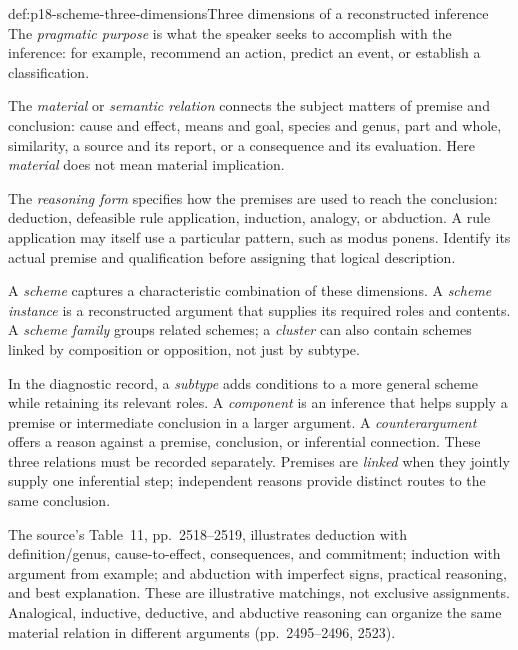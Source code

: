\begin{hbdefinition}{def:p18-scheme-three-dimensions}{Three dimensions of a reconstructed inference}
The \emph{pragmatic purpose} is what the speaker seeks to accomplish
with the inference: for example, recommend an action, predict an event,
or establish a classification.

The \emph{material} or \emph{semantic relation} connects the subject
matters of premise and conclusion: cause and effect, means and goal,
species and genus, part and whole, similarity, a source and its report,
or a consequence and its evaluation. Here \emph{material} does not mean
material implication.

The \emph{reasoning form} specifies how the premises are used to reach
the conclusion: deduction, defeasible rule application, induction,
analogy, or abduction. A rule application may itself use a particular
pattern, such as modus ponens. Identify its actual premise and
qualification before assigning that logical description.

A \emph{scheme} captures a characteristic combination of these
dimensions. A \emph{scheme instance} is a reconstructed argument that
supplies its required roles and contents. A \emph{scheme family}
groups related schemes; a \emph{cluster} can also contain schemes linked
by composition or opposition, not just by subtype.

In the diagnostic record, a \emph{subtype} adds conditions to a
more general scheme while retaining its relevant roles.
A \emph{component} is an inference that helps supply a premise
or intermediate conclusion in a larger argument.
A \emph{counterargument} offers a reason against a premise,
conclusion, or inferential connection. These three relations
must be recorded separately.
Premises are \emph{linked} when they jointly supply one
inferential step; independent reasons provide distinct routes
to the same conclusion.
\end{hbdefinition}

The source's Table~11, pp.~2518--2519, illustrates deduction with
definition/genus, cause-to-effect, consequences, and commitment;
induction with argument from example; and abduction with imperfect
signs, practical reasoning, and best explanation. These are illustrative
matchings, not exclusive assignments. Analogical, inductive, deductive,
and abductive reasoning can organize the same material relation in
different arguments (pp.~2495--2496, 2523).


